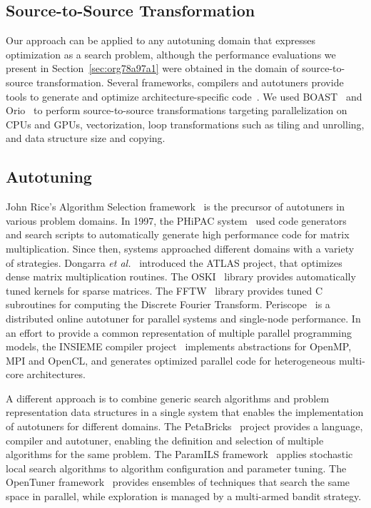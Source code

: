 \documentclass[conference]{IEEEtran}
\begin{document}
\subsection{Source-to-Source Transformation}
\label{sec:org5a1112e}
Our approach can be applied to any autotuning domain that expresses optimization
as a search problem, although the performance evaluations we present in
Section~\ref{sec:org78a97a1} were obtained in the domain of
source-to-source transformation. Several frameworks, compilers and autotuners
provide tools to generate and optimize architecture-specific
code~\cite{hartono2009annotation,videau2017boast,tiwari2009scalable,yi2007poet,ansel2009petabricks}.
We used BOAST~\cite{videau2017boast} and
Orio~\cite{hartono2009annotation} to perform source-to-source
transformations targeting parallelization on CPUs and GPUs, vectorization, loop
transformations such as tiling and unrolling, and data structure size and
copying.
\subsection{Autotuning}
\label{sec:org416c015}
John Rice's Algorithm Selection framework~\cite{rice1976algorithm} is the
precursor of autotuners in various problem domains. In 1997, the PHiPAC
system~\cite{bilmes1997optimizing} used code generators and search scripts
to automatically generate high performance code for matrix multiplication. Since
then, systems approached different domains with a variety of strategies.
Dongarra \emph{et al.}~\cite{dongarra1998automatically} introduced the ATLAS
project, that optimizes dense matrix multiplication routines. The
OSKI~\cite{vuduc2005oski} library provides automatically tuned kernels for
sparse matrices. The FFTW~\cite{frigo1998fftw} library provides tuned C
subroutines for computing the Discrete Fourier Transform.
Periscope~\cite{gerndt2010automatic} is a distributed online autotuner for
parallel systems and single-node performance. In an effort to provide a common
representation of multiple parallel programming models, the INSIEME compiler
project~\cite{jordan2012multi} implements abstractions for OpenMP, MPI and
OpenCL, and generates optimized parallel code for heterogeneous multi-core
architectures.

A different approach is to combine generic search algorithms and problem
representation data structures in a single system that enables the
implementation of autotuners for different domains. The
PetaBricks~\cite{ansel2009petabricks} project provides a language,
compiler and autotuner, enabling the definition and selection of multiple
algorithms for the same problem. The ParamILS
framework~\cite{hutter2009paramils} applies stochastic local search
algorithms to algorithm configuration and parameter tuning. The OpenTuner
framework~\cite{ansel2014opentuner} provides ensembles of techniques that
search the same space in parallel, while exploration is managed by a multi-armed
bandit strategy.
\end{document}
